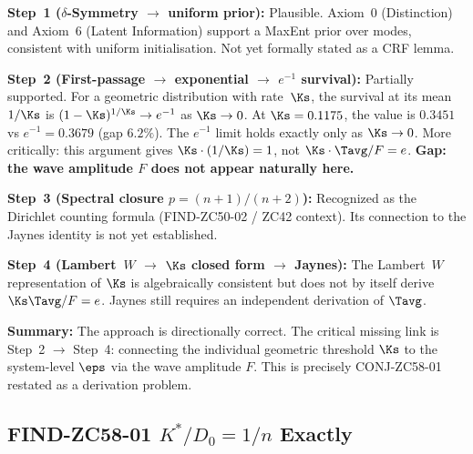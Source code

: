 \documentclass[12pt, a4paper]{article}
\begin{document}
\begin{keybox}[title={NotebookLM Approach Assessment}]
\textbf{Step~1 ($\delta$-Symmetry $\to$ uniform prior):}
Plausible.  Axiom~0 (Distinction) and Axiom~6 (Latent Information)
support a MaxEnt prior over modes, consistent with uniform
initialisation.  Not yet formally stated as a CRF lemma.

\medskip
\textbf{Step~2 (First-passage $\to$ exponential $\to$ $e^{-1}$ survival):}
Partially supported.  For a geometric distribution with rate~$\Ks$,
the survival at its mean $1/\Ks$ is $(1-\Ks)^{1/\Ks}\to e^{-1}$
as $\Ks\to0$.  At $\Ks=0.1175$, the value is $0.3451$ vs
$e^{-1}=0.3679$ (gap $6.2\%$).  The $e^{-1}$ limit holds exactly
only as $\Ks\to0$.  More critically: this argument gives
$\Ks\cdot(1/\Ks)=1$, not $\Ks\cdot\Tavg/F=e$.
\textbf{Gap: the wave amplitude $F$ does not appear naturally here.}

\medskip
\textbf{Step~3 (Spectral closure $p=(n{+}1)/(n{+}2)$):}
Recognized as the Dirichlet counting formula
(FIND-ZC50-02 / ZC42 context).  Its connection to the Jaynes
identity is not yet established.

\medskip
\textbf{Step~4 (Lambert~$W$ $\to$ $\Ks$ closed form $\to$ Jaynes):}
The Lambert~$W$ representation of $\Ks$ is algebraically
consistent but does not by itself derive $\Ks\Tavg/F=e$.
Jaynes still requires an independent derivation of $\Tavg$.

\medskip
\textbf{Summary:} The approach is directionally correct.
The critical missing link is Step~2 $\to$ Step~4: connecting
the individual geometric threshold $\Ks$ to the system-level
$\eps$ via the wave amplitude $F$.  This is precisely
CONJ-ZC58-01 restated as a derivation problem.
\end{keybox}

\subsection{FIND-ZC58-01 \quad $K^*/D_0 = 1/n$ Exactly}
\label{sec:find01}

\end{document}
